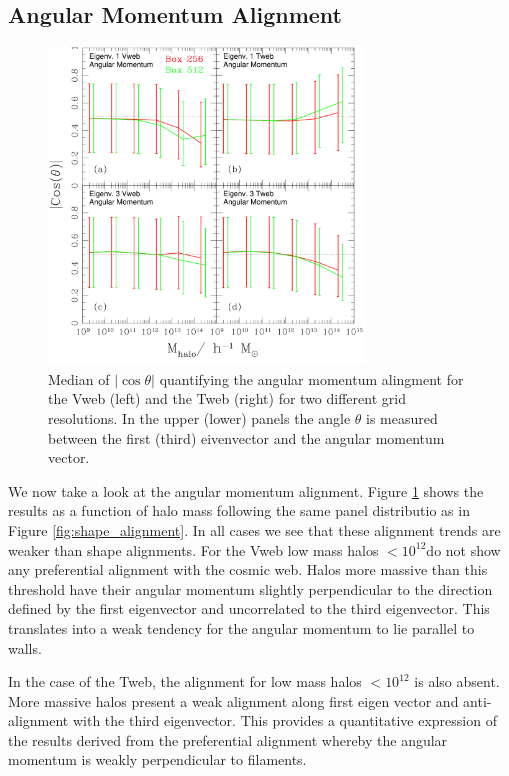 \documentclass[useAMS,usenatbib]{mn2e}
\newcommand{\hMsun}{{\ifmmode{h^{-1}{\rm
        {M_{\odot}}}}\else{$h^{-1}{\rm{M_{\odot}}}$~}\fi}}
\begin{document}
\subsection{Angular Momentum Alignment}

\begin{figure}
\includegraphics[width=0.75\textwidth]{Fig3.pdf}
\caption{Median of $|\cos\theta|$ quantifying the angular momentum
  alingment for the Vweb (left) and the Tweb (right) for two different
  grid resolutions. In the upper (lower) panels the angle $\theta$ is
  measured between the first (third) eivenvector and the angular
  momentum vector.\label{fig:spin_alignment}} 
\end{figure}


We now take a look at the angular momentum alignment. Figure
\ref{fig:spin_alignment} shows the results as a function of halo mass
following the same panel distributio as in Figure
\ref{fig:shape_alignment}. In all cases we see that these alignment
trends are weaker than shape alignments. For the Vweb low mass halos
$<10^{12}$\hMsun do not show any preferential alignment with the
cosmic web. Halos more massive than this threshold have their angular
momentum slightly perpendicular to the direction defined by the first
eigenvector and uncorrelated to the third eigenvector. This translates
into a weak tendency for the angular momentum to lie parallel to walls.

In the case of the Tweb, the alignment for low mass halos $<10^{12}$\hMsun 
is also absent. More massive halos present a weak alignment along
first eigen vector and anti-alignment with the third eigenvector. This
provides a quantitative expression of the results derived from the
preferential alignment whereby the angular momentum is weakly
perpendicular to filaments.
\end{document}
